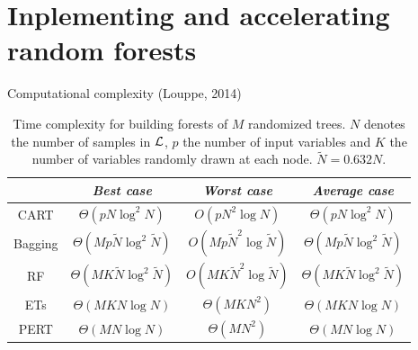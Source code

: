 \documentclass{beamer}
\begin{document}

\section{Inplementing and accelerating random forests}

\begin{frame}{Computational complexity {\scriptsize (Louppe, 2014)}}

\begin{table}
    \centering
    \begin{tabular}{| c | c c c |}
    \hline
         & \textit{Best case} & \textit{Worst case} & \textit{Average case}  \\
    \hline
    \hline
    CART & $\Theta(pN\log^2 N)$ & $O(pN^2\log N)$ & $\Theta(pN\log^2 N)$ \\
    Bagging & $\Theta(Mp\widetilde{N}\log^2 \widetilde{N})$ & $O(Mp\widetilde{N}^2\log \widetilde{N})$ & $\Theta(Mp\widetilde{N}\log^2 \widetilde{N})$  \\
    RF & $\Theta(MK\widetilde{N}\log^2 \widetilde{N})$ & $O(MK\widetilde{N}^2\log \widetilde{N})$ & $\Theta(MK\widetilde{N}\log^2 \widetilde{N})$  \\
    ETs & $\Theta(MKN\log N)$ & $\Theta(MKN^2)$ & $\Theta(MKN\log N)$  \\
    PERT & $\Theta(MN\log N)$ & $\Theta(MN^2)$ & $\Theta(MN\log N)$  \\
    \hline
    \end{tabular}
    \caption{Time complexity for building forests of $M$ randomized trees. $N$ denotes the number of samples in ${\cal L}$, $p$ the number of input variables and $K$ the number of variables randomly drawn at each node. $\widetilde{N} = 0.632 N$.}
    \label{table:complexity-fit}
\end{table}

\end{frame}
\end{document}
